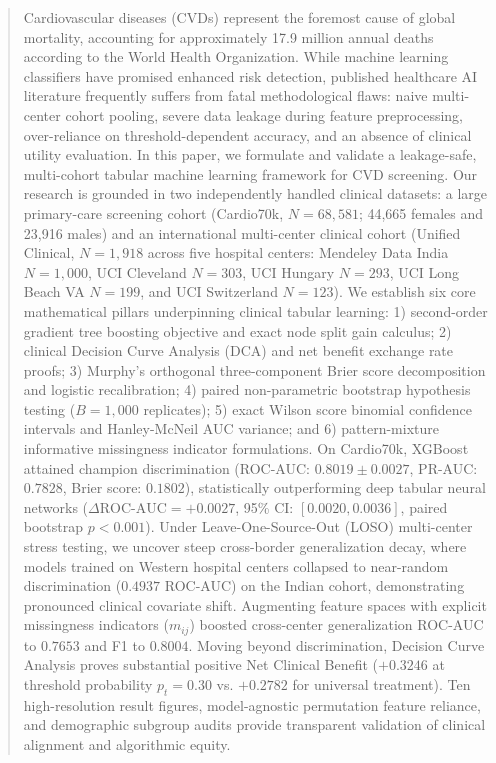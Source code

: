 \documentclass[conference]{IEEEtran}
\begin{document}
\begin{abstract}
Cardiovascular diseases (CVDs) represent the foremost cause of global mortality, accounting for approximately 17.9 million annual deaths according to the World Health Organization. While machine learning classifiers have promised enhanced risk detection, published healthcare AI literature frequently suffers from fatal methodological flaws: naive multi-center cohort pooling, severe data leakage during feature preprocessing, over-reliance on threshold-dependent accuracy, and an absence of clinical utility evaluation. In this paper, we formulate and validate a leakage-safe, multi-cohort tabular machine learning framework for CVD screening. Our research is grounded in two independently handled clinical datasets: a large primary-care screening cohort (Cardio70k, $N = 68,581$; 44,665 females and 23,916 males) and an international multi-center clinical cohort (Unified Clinical, $N = 1,918$ across five hospital centers: Mendeley Data India $N=1,000$, UCI Cleveland $N=303$, UCI Hungary $N=293$, UCI Long Beach VA $N=199$, and UCI Switzerland $N=123$). We establish six core mathematical pillars underpinning clinical tabular learning: 1) second-order gradient tree boosting objective and exact node split gain calculus; 2) clinical Decision Curve Analysis (DCA) and net benefit exchange rate proofs; 3) Murphy's orthogonal three-component Brier score decomposition and logistic recalibration; 4) paired non-parametric bootstrap hypothesis testing ($B = 1,000$ replicates); 5) exact Wilson score binomial confidence intervals and Hanley-McNeil AUC variance; and 6) pattern-mixture informative missingness indicator formulations. On Cardio70k, XGBoost attained champion discrimination (ROC-AUC: $0.8019 \pm 0.0027$, PR-AUC: $0.7828$, Brier score: $0.1802$), statistically outperforming deep tabular neural networks ($\Delta\text{ROC-AUC} = +0.0027$, 95\% CI: $[0.0020, 0.0036]$, paired bootstrap $p < 0.001$). Under Leave-One-Source-Out (LOSO) multi-center stress testing, we uncover steep cross-border generalization decay, where models trained on Western hospital centers collapsed to near-random discrimination ($0.4937$ ROC-AUC) on the Indian cohort, demonstrating pronounced clinical covariate shift. Augmenting feature spaces with explicit missingness indicators ($m_{ij}$) boosted cross-center generalization ROC-AUC to $0.7653$ and F1 to $0.8004$. Moving beyond discrimination, Decision Curve Analysis proves substantial positive Net Clinical Benefit ($+0.3246$ at threshold probability $p_t = 0.30$ vs. $+0.2782$ for universal treatment). Ten high-resolution result figures, model-agnostic permutation feature reliance, and demographic subgroup audits provide transparent validation of clinical alignment and algorithmic equity.
\end{abstract}
\end{document}
